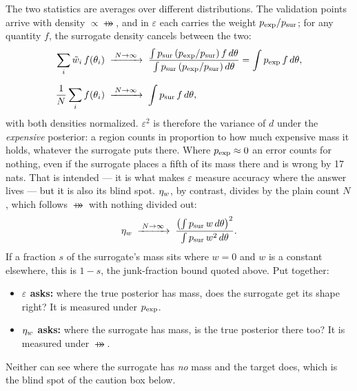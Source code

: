 The two statistics are averages over different distributions. The validation points arrive with
density $\propto \psur$, and in $\varepsilon$ each carries the weight $p_{\mathrm{exp}}/p_{\mathrm{sur}}$; for any quantity
$f$, the surrogate density cancels between the two:
\begin{align}
  \sum_i \tilde w_i\, f(\theta_i)
  &\;\xrightarrow{\;N\to\infty\;}\;
  \frac{\int p_{\mathrm{sur}}\,(p_{\mathrm{exp}}/p_{\mathrm{sur}})\, f \,d\theta}{\int p_{\mathrm{sur}}\,(p_{\mathrm{exp}}/p_{\mathrm{sur}})\,d\theta}
  = \int p_{\mathrm{exp}}\, f\, d\theta ,
  \notag\\[6pt]
  \frac{1}{N}\sum_i f(\theta_i) &\;\xrightarrow{\;N\to\infty\;}\; \int p_{\mathrm{sur}}\, f\, d\theta ,
  \label{eq:criteria-measures}
\end{align}
with both densities normalized. $\varepsilon^2$ is therefore the variance of $d$ under the
\emph{expensive} posterior: a region counts in proportion to how much expensive mass it holds,
whatever the surrogate puts there. Where $p_{\mathrm{exp}} \approx 0$ an error counts for nothing, even if the
surrogate places a fifth of its mass there and is wrong by 17 nats. That is intended --- it is what
makes $\varepsilon$ measure accuracy where the answer lives --- but it is also its blind spot.
$\eta_w$, by contrast, divides by the plain count $N$, which follows $\psur$ with nothing divided out:
\begin{equation}
  \eta_w \;\xrightarrow{\;N\to\infty\;}\;
  \frac{\left(\int p_{\mathrm{sur}}\, w \,d\theta\right)^2}{\int p_{\mathrm{sur}}\, w^2 \,d\theta} .
\end{equation}
If a fraction $s$ of the surrogate's mass sits where $w = 0$ and $w$ is a constant elsewhere, this is
$1-s$, the junk-fraction bound quoted above. Put together:
\begin{itemize}
  \item \textbf{$\varepsilon$ asks:} where the true posterior has mass, does the surrogate get its
        shape right? It is measured under $p_{\mathrm{exp}}$.
  \item \textbf{$\eta_w$ asks:} where the surrogate has mass, is the true posterior there too? It is
        measured under $\psur$.
\end{itemize}
Neither can see where the surrogate has \emph{no} mass and the target does, which is the blind spot
of the caution box below.

